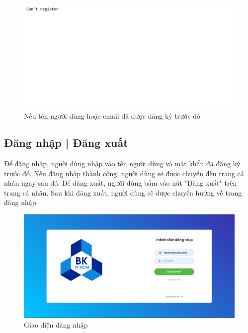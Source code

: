 \documentclass[a4paper]{article}
\begin{document}
	\begin{figure}[H]
		\centering
		\includegraphics[scale=0.8]{can_not_register.png}
		\caption{Nếu tên người dùng hoặc email đã được đăng ký trước đó}
		\label{F:can_not_register}
	\end{figure}
	
	\subsection{Đăng nhập | Đăng xuất}
	Để đăng nhập, người dùng nhập vào tên người dùng và mật khẩu đã đăng ký trước đó. Nếu đăng nhập thành công, người dùng sẽ được chuyển đến trang cá nhân ngay sau đó.\linebreak
	Để đăng xuất, người dùng bấm vào nút "Đăng xuất" trên trang cá nhân. Sau khi đăng xuất, người dùng sẽ được chuyển hướng về trang đăng nhập.
	
	\begin{figure}[H]
		\centering
		\includegraphics[scale=0.36]{login.png}
		\caption{Giao diện đăng nhập}
		\label{F:login}
	\end{figure}
	
\end{document}
